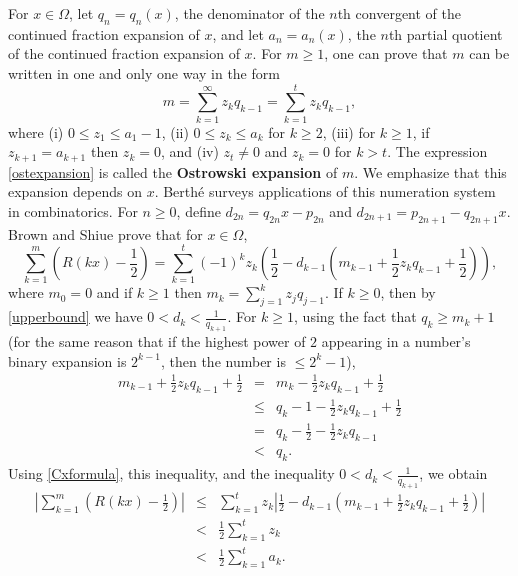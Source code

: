 \documentclass{article}
\begin{document}
For $x \in \Omega$, let $q_n=q_n(x)$, the denominator of the $n$th convergent of the continued fraction expansion of $x$,
 and let $a_n=a_n(x)$, the $n$th partial quotient of the continued fraction expansion of $x$. For $m \geq 1$, one can prove
 \cite[p.~211, Proposition~1]{berthe} that $m$ can be written in one and only one way in the form
\begin{equation}
 m=\sum_{k=1}^\infty z_k q_{k-1}=\sum_{k=1}^t z_k q_{k-1},
 \label{ostexpansion}
\end{equation}
 where (i) $0 \leq z_1 \leq a_1-1$, (ii) $0 \leq z_k \leq a_k$ for $k \geq 2$, (iii) for $k \geq 1$, if $z_{k+1}=a_{k+1}$ then
 $z_k=0$, and (iv) $z_t \neq 0$ and $z_k=0$ for $k>t$. The expression \eqref{ostexpansion} is called the \textbf{Ostrowski expansion} of $m$. We emphasize that
 this expansion depends on $x$. Berth\'e \cite{berthe} surveys applications of this numeration system in combinatorics.
 For $n \geq 0$, define $d_{2n}=q_{2n}x-p_{2n}$ and $d_{2n+1}=p_{2n+1}-q_{2n+1}x$. 
 Brown and Shiue \cite[p.~184, Theorem~1]{MR1316813} prove that for $x \in \Omega$,
\begin{equation}
\sum_{k=1}^m \left(R(kx)-\frac{1}{2}\right)=\sum_{k=1}^t (-1)^k z_k\left( \frac{1}{2}-d_{k-1}\left(m_{k-1}+\frac{1}{2}z_k q_{k-1}+\frac{1}{2}\right) \right),
\label{Cxformula}
\end{equation}
where $m_0=0$ and if $k \geq 1$ then $m_k=\sum_{j=1}^k z_j q_{j-1}$.
If $k \geq 0$, then by \eqref{upperbound} we have $0<d_k<\frac{1}{q_{k+1}}$.
For $k \geq 1$, using the fact that $q_k \geq m_k+1$ (for the same reason that if the highest power of $2$ appearing in a number's binary expansion is $2^{k-1}$, then the number
is $\leq 2^k-1$),
\begin{eqnarray*}
m_{k-1}+\frac{1}{2}z_k q_{k-1}+\frac{1}{2}&=&m_k-\frac{1}{2}z_kq_{k-1} + \frac{1}{2}\\
&\leq&q_k-1-\frac{1}{2}z_kq_{k-1} + \frac{1}{2}\\
&=&q_k-\frac{1}{2}-\frac{1}{2}z_kq_{k-1}\\
&<&q_k.
\end{eqnarray*} 
Using \eqref{Cxformula}, this inequality, and the inequality $0<d_k<\frac{1}{q_{k+1}}$, we obtain
\begin{eqnarray*}
\left| \sum_{k=1}^m \left(R(kx)-\frac{1}{2}\right) \right| &\leq& \sum_{k=1}^t z_k \left|\frac{1}{2}-d_{k-1}\left(m_{k-1}+\frac{1}{2}z_k q_{k-1}+\frac{1}{2}\right) \right|\\
&<&\frac{1}{2}\sum_{k=1}^t z_k\\
&<&\frac{1}{2}\sum_{k=1}^t a_k.
\end{eqnarray*}
\end{document}
